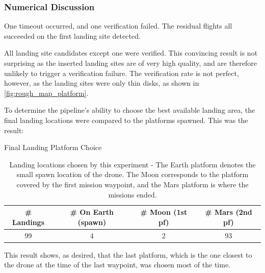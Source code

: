         \subsubsection{Numerical Discussion}
        One timeout occurred, and one verification failed. The residual flights all succeeded on the first landing site detected.

        
        All landing site candidates except one were verified. This convincing result is not surprising as the inserted landing sites are of very high quality, and are therefore unlikely to trigger a verification failure. The verification rate is not perfect, however, as the landing sites were only thin disks, as shown in \cref{fig:rough_map_platform}. 

        To determine the pipeline's ability to choose the best available landing area, the final landing locations were compared to the platforms spawned. This was the result:

        \begin{table}[h]
            \begin{center}
             \caption{Final Landing Platform Choice}\vspace{1ex}
             \label{tab:final_landing_platform}
             \begin{tabular}{|c|c|c|c|}
             \hline
             \# Landings & \# On Earth (spawn) & \# Moon (1st pf)  & \# Mars (2nd pf)\\ \hline \hline
             99 & 4 & 2 & 93 \\
             \hline
            \end{tabular}
        \end{center}
        \caption{Landing locations chosen by this experiment - The Earth platform denotes the small spawn location of the drone. The Moon corresponds to the platform covered by the first mission waypoint, and the Mars platform is where the missions ended.}
        \end{table}

        This result shows, as desired, that the last platform, which is the one closest to the drone at the time of the last waypoint, was chosen most of the time. 
        
